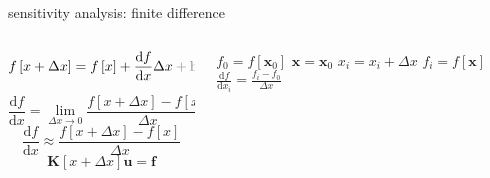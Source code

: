 \documentclass[aspectratio=169]{beamer}
\begin{document}
\begin{frame}{sensitivity analysis: finite difference}




\begin{columns}
    \begin{column}{.7\linewidth}
    \begin{equation*}
    f\left[x + \Delta x\right] = f\left[x\right] + \frac{\text{d} f}{\text{d} x} \Delta x \color{gray} + \text{h.o.t.}
\end{equation*}

\vfill
\begin{equation*}
    \frac{\text{d} f}{\text{d} x} = \lim_{\Delta x \rightarrow 0} \frac{f\left[x + \Delta x\right] - f\left[x\right]}{\Delta x}
\end{equation*}
\vfill
\begin{equation*}
        \frac{\text{d} f}{\text{d} x} \approx \frac{f\left[x + \Delta x\right] - f\left[x\right]}{\Delta x}
\end{equation*}
\begin{equation*}
    \mathbf{K}\left[x + \Delta x\right]\mathbf{u} = \mathbf{f}
\end{equation*}
    \vfill
    \end{column}

    \begin{column}{.3\linewidth}
    \centering

    \begin{algorithmic}
    \STATE $f_0 = f\left[\mathbf{x}_0\right]$
    \STATE $\mathbf{x} = \mathbf{x}_0$
    \STATE $x_i = x_i + \Delta x$
    \STATE $f_i = f\left[\mathbf{x}\right]$
    \STATE $\frac{\text{d}f}{\text{d}x_i} = \frac{f_i - f_0}{\Delta x}$
\ENDFOR
\end{algorithmic}


    \end{column}
\end{columns}




\end{frame}
\end{document}
